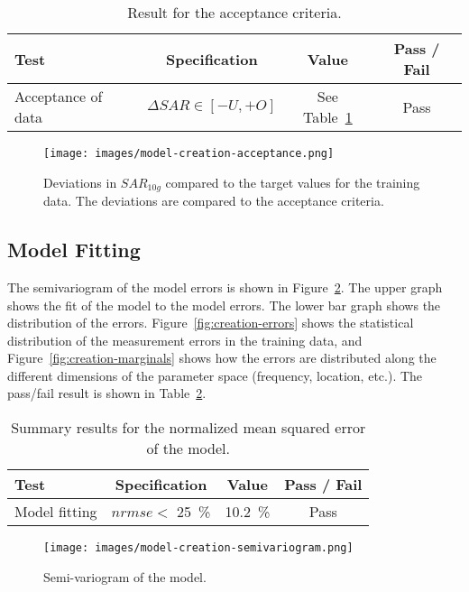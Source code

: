 \documentclass{article}
\begin{document}
\begin{table}[h]\centering
\begin{tabular}{|l|c|c|c|}\hline
\textbf{Test} & \textbf{Specification} & \textbf{Value} & \textbf{Pass / Fail} \\\hline
Acceptance of data & $\Delta SAR \in [-U, +O]$ & See Table~\ref{tab:acceptance}& Pass \\\hline
\end{tabular}\caption{Result for the acceptance criteria.}\label{tab:acceptance}
\end{table}

\begin{figure}[H] \centering
\texttt{[image: images/model-creation-acceptance.png]}
\caption{Deviations in $SAR_{10g}$ compared to the target values for the training data. The deviations are compared to the acceptance criteria.} \label{fig:creation-acc}
\end{figure}

\FloatBarrier
\subsection{Model Fitting}
The semivariogram of the model errors is shown in Figure~\ref{fig:creation-variogram}. The upper graph shows the fit of the model to the model errors. The lower bar graph shows the distribution of the errors. Figure~\ref{fig:creation-errors} shows the statistical distribution of the measurement errors in the training data, and Figure~\ref{fig:creation-marginals} shows how the errors are distributed along the different dimensions of the parameter space (frequency, location, etc.). The pass/fail result is shown in Table~\ref{tab:nrmse}.

\begin{table}[ht]\centering
\begin{tabular}{|l|c|c|c|}\hline
\textbf{Test} & \textbf{Specification} & \textbf{Value} & \textbf{Pass / Fail} \\\hline
Model fitting & $nrmse <$ 25~\%  & 10.2~\%   & Pass \\\hline
\end{tabular}\caption{Summary results for the normalized mean squared error of the model.} \label{tab:nrmse}
\end{table}


\begin{figure} \centering
\texttt{[image: images/model-creation-semivariogram.png]}
\caption{Semi-variogram of the model.} \label{fig:creation-variogram}
\end{figure}
\end{document}

